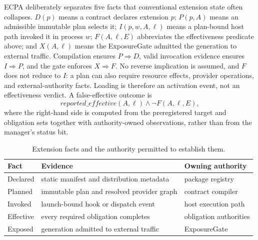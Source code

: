 \documentclass[letterpaper,twocolumn,10pt]{article}
\begin{document}
ECPA deliberately separates five facts that conventional extension state often
collapses.  $D(p)$ means a contract declares extension $p$; $P(p,A)$ means an
admissible immutable plan selects it; $I(p,w,A,\ell)$ means a plan-bound host
path invoked it in process $w$; $F(A,\ell,E)$ abbreviates the effectiveness
predicate above; and $X(A,\ell)$ means the ExposureGate admitted the generation
to external traffic.  Compilation ensures $P\Rightarrow D$, valid invocation
evidence ensures $I\Rightarrow P$, and the gate enforces $X\Rightarrow F$.
No reverse implication is assumed, and $F$ does not reduce to $I$: a plan can
also require resource effects, provider operations, and external-authority
facts.  Loading is therefore an activation event, not an effectiveness
verdict.  A false-effective outcome is
\begin{equation*}
reported\_effective(A,\ell) \land \neg F(A,\ell,E),
\end{equation*}
where the right-hand side is computed from the preregistered target and
obligation sets together with authority-owned observations, rather than from
the manager's status bit.

\begin{table}[t]
\centering\small
\caption{Extension facts and the authority permitted to establish them.}
\begin{tabularx}{\columnwidth}{@{}lXX@{}}
\toprule
Fact & Evidence & Owning authority \\
\midrule
Declared & static manifest and distribution metadata & package registry \\
Planned & immutable plan and resolved provider graph & contract compiler \\
Invoked & launch-bound hook or dispatch event & host execution path \\
Effective & every required obligation completes & obligation authorities \\
Exposed & generation admitted to external traffic & ExposureGate \\
\bottomrule
\end{tabularx}
\end{table}
\end{document}
